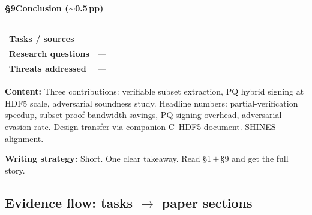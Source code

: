 \documentclass[11pt]{article}
\makeatletter
\newcommand{\mapsec}[3]{%
  \smallskip\noindent
  \begin{tabular}{@{}p{3.2cm}p{9.8cm}@{}}
  \toprule
  \textbf{Tasks / sources}    & #1 \\
  \textbf{Research questions} & #2 \\
  \textbf{Threats addressed}  & #3 \\
  \bottomrule
  \end{tabular}\smallskip}
\makeatother
\begin{document}
\bigskip
\noindent\textcolor{blue!60!black}{\textbf{\S9\quad Conclusion \hfill($\sim$0.5\,pp)}}
\par\noindent\rule{\linewidth}{0.4pt}
\mapsec{---}{---}{---}

\noindent\textbf{Content:} Three contributions: verifiable subset extraction, PQ hybrid
signing at HDF5 scale, adversarial soundness study. Headline numbers: partial-verification
speedup, subset-proof bandwidth savings, PQ signing overhead, adversarial-evasion rate.
Design transfer via companion C~HDF5 document. SHINES alignment.

\noindent\textbf{Writing strategy:} Short. One clear takeaway. Read \S1\,$+$\,\S9 and
get the full story.

\bigskip
\subsection*{\textcolor{blue!60!black}{Evidence flow: tasks $\rightarrow$ paper sections}}
\end{document}
